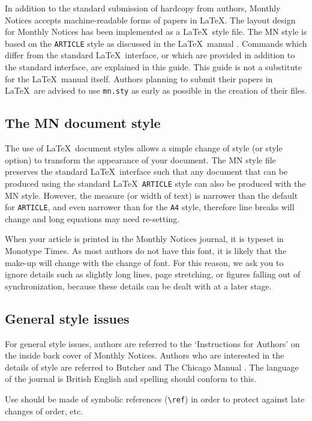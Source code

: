 In addition to the standard submission of hardcopy from authors,
Monthly Notices accepts machine-readable forms of papers in \LaTeX.
The layout design for Monthly Notices has been implemented as a
\LaTeX\ style file. The MN style is based on the \verb"ARTICLE" style
as discussed in the \LaTeX\ manual \cite {la}. Commands which differ
from the standard \LaTeX\ interface, or which are provided in addition
to the standard interface, are explained in this guide. This guide is
not a substitute for the \LaTeX\ manual itself. Authors planning to
submit their papers in \LaTeX\ are advised to use \verb"mn.sty" as
early as possible in the creation of their files.

\subsection{The MN document style}

The use of \LaTeX\ document styles allows a simple change of style
(or style option) to transform the appearance of your document. The
MN style file preserves the standard \LaTeX\ interface such that any
document that can be produced using the standard \LaTeX\ \verb"ARTICLE"
style can also be produced with the MN style. However, the measure (or
width of text) is narrower than the default for \verb"ARTICLE", and even
narrower than for the \verb"A4" style, therefore line breaks will change
and long equations may need re-setting. 

When your article is printed in the Monthly Notices journal, it is typeset
in Monotype Times. As most authors do not have this font, it is likely that
the make-up will change with the change of font. For this reason, we ask
you to ignore details such as slightly long lines, page stretching, or
figures falling out of synchronization, because these details can be dealt with at a later stage.

\subsection{General style issues}

For general style issues, authors are referred to the `Instructions for
 Authors' on the inside back cover of Monthly Notices. Authors
who are interested in the details of style are referred to Butcher
 and The Chicago Manual . The language of
the journal is British English and spelling should conform to this.

Use should be made of symbolic references (\verb"\ref") in order to
protect against late changes of order, etc.

